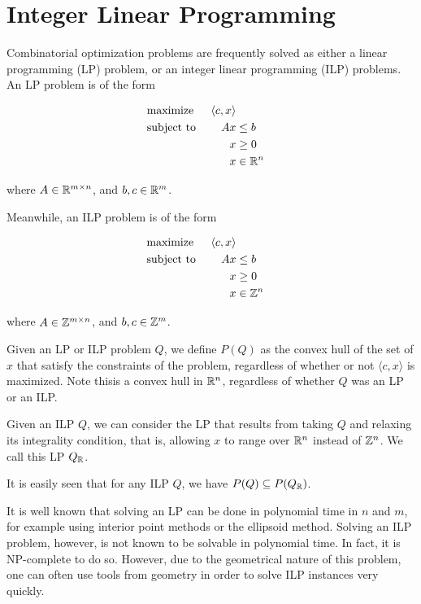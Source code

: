 \section{Integer Linear Programming}
\label{app:ilp}
Combinatorial optimization problems are frequently solved as either a linear programming (LP) problem, or an integer linear programming (ILP) problems. An LP problem is of the form

\begin{align*}
&\text{maximize }  & \langle c, x \rangle\\
&\text{subject to }& Ax &\le b&\\
&                  & x &\ge 0&\\
&                  & x &\in \mathbb{R}^n&
\end{align*}

where $A \in \mathbb{R}^{m \times n}$, and $b, c \in \mathbb{R}^m$.

Meanwhile, an ILP problem is of the form

\begin{align*}
&\text{maximize }  & \langle c, x \rangle\\
&\text{subject to }& Ax &\le b&\\
&                  & x &\ge 0&\\
&                  & x &\in \mathbb{Z}^n&
\end{align*}

where $A \in \mathbb{Z}^{m \times n}$, and $b, c \in \mathbb{Z}^m$.

Given an LP or ILP problem $Q$, we define $P(Q)$ as the convex hull of the set of $x$ that satisfy the constraints of the problem, regardless of whether or not $\langle c, x \rangle$ is maximized. Note thisis a convex hull in $\mathbb{R}^n$, regardless of whether $Q$ was an LP or an ILP.

Given an ILP $Q$, we can consider the LP that results from taking $Q$ and relaxing its integrality condition, that is, allowing $x$ to range over $\mathbb{R}^n$ instead of $\mathbb{Z}^n$. We call this LP $Q_{\mathbb{R}}$.

It is easily seen that for any ILP $Q$, we have $P(Q) \subseteq P(Q_{\mathbb{R}})$.

It is well known that solving an LP can be done in polynomial time in $n$ and $m$\cite{lp}, for example using interior point methods or the ellipsoid method. Solving an ILP problem, however, is not known to be solvable in polynomial time. In fact, it is NP-complete to do so\cite{Garey:1990:CIG:574848}. However, due to the geometrical nature of this problem, one can often use tools from geometry in order to solve ILP instances very quickly.

